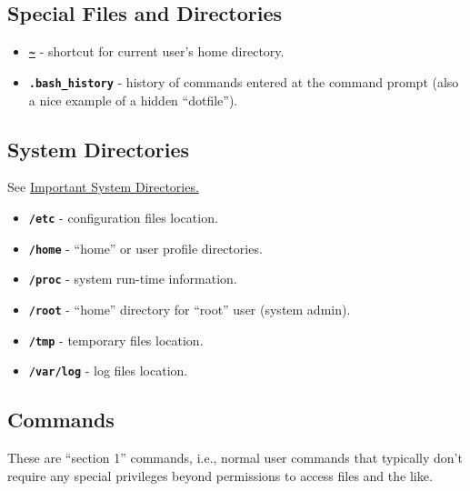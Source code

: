 \documentclass[10pt,]{book}
\numberwithin{figure}{chapter}
\begin{document}
\subsection{Special Files and
Directories}\label{special-files-and-directories}

\begin{itemize}
\item
  \href{http://linux.die.net/Bash-Beginners-Guide/sect_03_04.html}{\textbf{\texttt{\textasciitilde{}}}}
  - shortcut for current user's home directory.
\item
  \textbf{\texttt{.bash\_history}} - history of commands entered at the
  command prompt (also a nice example of a hidden ``dotfile'').
\end{itemize}

\subsection{System Directories}\label{system-directories}

See \href{http://linux.die.net/abs-guide/systemdirs.html}{Important
System Directories.}

\begin{itemize}
\item
  \textbf{\texttt{/etc}} - configuration files location.
\item
  \textbf{\texttt{/home}} - ``home'' or user profile directories.
\item
  \textbf{\texttt{/proc}} - system run-time information.
\item
  \textbf{\texttt{/root}} - ``home'' directory for ``root'' user (system
  admin).
\item
  \textbf{\texttt{/tmp}} - temporary files location.
\item
  \textbf{\texttt{/var/log}} - log files location.
\end{itemize}

\subsection{Commands}\label{commands}

These are ``section 1'' commands, i.e., normal user commands that
typically don't require any special privileges beyond permissions to
access files and the like.
\end{document}

